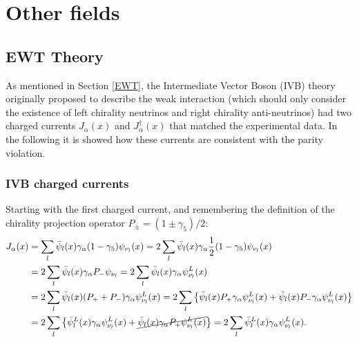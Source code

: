 \clearpage
\section{Other fields}
\label{app:D}

\subsection{EWT Theory}

As mentioned in Section \ref{EWT}, the Intermediate Vector Boson (IVB) theory originally proposed to describe the weak interaction (which should only consider the existence of left chirality neutrinos and right chirality anti-neutrinos) had two charged currents $J_{\alpha}(x)$ and $J^{\dagger}_{\alpha}(x)$ that matched the experimental data. In the following it is showed how these currents are consistent with the parity violation.

\subsubsection{IVB charged currents} \label{ssec:IVBcurrents}

Starting with the first charged current, and remembering the definition of the chirality projection operator $P_{\pm} = (1\pm\gamma_5)/2$:
\begin{align}
    J_{\alpha}(x) &= \sum_{l} \Bar{\psi}_l(x) \gamma_{\alpha} (1-\gamma_5) \psi_{\nu_l}(x) = 2\sum_{l} \Bar{\psi}_l(x) \gamma_{\alpha} \dfrac{1}{2}(1-\gamma_5) \psi_{\nu_l}(x) \nonumber \\
    &= 2 \sum_l \Bar{\psi}_l(x) \gamma_{\alpha}P_-\psi_{\nu_l} = 2\sum_l \Bar{\psi}_l(x)\gamma_{\alpha}\psi^L_{\nu_l}(x) \nonumber \\
    &= 2 \sum_l \Bar{\psi}_l(x) (P_+ + P_-) \gamma_{\alpha} \psi^L_{\nu_l}(x) = 2\sum_l\left\{ \Bar{\psi}_l(x)P_+\gamma_{\alpha}\psi^L_{\nu_l}(x) + \Bar{\psi}_l(x)P_-\gamma_{\alpha}\psi^L_{\nu_l}(x) \right\} \nonumber \\
\label{firstcurrent}
    &= 2\sum_l\left\{ \Bar{\psi}^L_l(x)\gamma_{\alpha}\psi^L_{\nu_l}(x) + \cancel{\Bar{\psi}_l(x)\gamma_{\alpha}P_+\psi^L_{\nu_l}(x)} \right\} = 2\sum_l \Bar{\psi}^L_l(x)\gamma_{\alpha}\psi^L_{\nu_l}(x).
\end{align}

